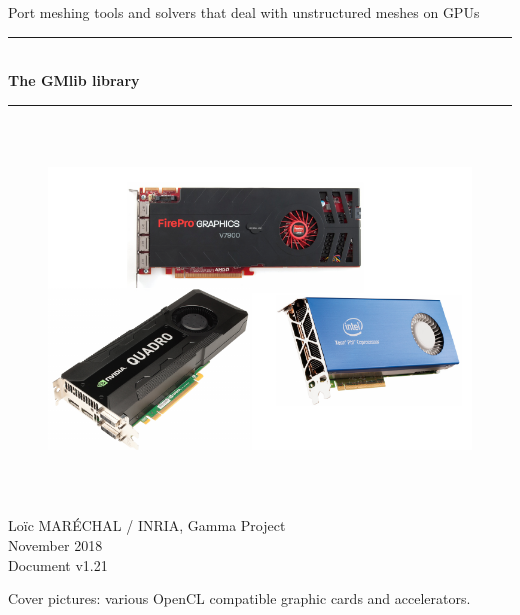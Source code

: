 \documentclass[a4paper,12pt]{article}
\newcommand{\HRule}{\rule{\linewidth}{1mm}}
\begin{document}
%
%

\begin{titlepage}

\begin{center}
\huge Port meshing tools and solvers that deal with unstructured meshes on GPUs
\HRule \\
\medskip
{\Huge \bfseries The GMlib library} \\
\HRule
\end{center}


\begin{figure}[htbp]
\begin{center}
\includegraphics[height=10cm]{gpu.pdf}
\end{center}
\end{figure}


\begin{flushright}
\Large Lo\"ic MAR\'ECHAL / INRIA, Gamma Project\\
\Large November 2018 \\
\normalsize Document v1.21
\end{flushright}

\end{titlepage}

\clearpage

\setcounter{tocdepth}{2}
\tableofcontents
\vfill

\footnotesize{Cover pictures: various OpenCL compatible graphic cards and accelerators.}
\normalsize
\end{document}
